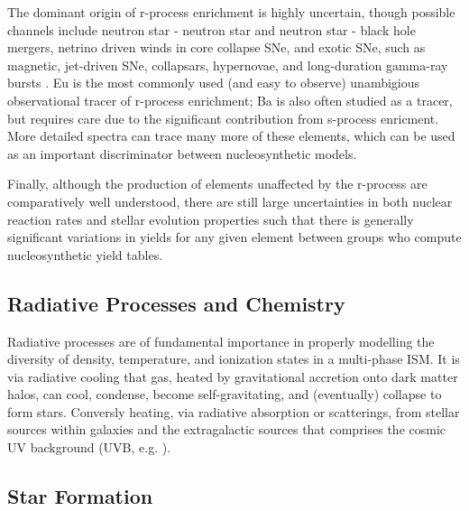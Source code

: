 The dominant origin of r-process enrichment is highly uncertain, though possible channels include neutron star - neutron star and neutron star - black hole mergers, netrino driven winds in core collapse SNe, and exotic SNe, such as magnetic, jet-driven SNe, collapsars, hypernovae, and long-duration gamma-ray bursts \citep[see ][ for recent reviews]{Frebel2018, Cowan2019}. Eu is the most commonly used (and easy to observe) unambigious observational tracer of r-process enrichment; Ba is also often studied as a tracer, but requires care due to the significant contribution from s-process enricment. More detailed spectra \citep[e.g.][]{Ji2018a} can trace many more of these elements, which can be used as an important discriminator between nucleosynthetic models.

Finally, although the production of elements unaffected by the r-process are comparatively well understood, there are still large uncertainties in both nuclear reaction rates and stellar evolution properties such that there is generally significant variations in yields for any given element between groups who compute nucleosynthetic yield tables.


\subsection{Radiative Processes and Chemistry}
\label{intro:sec:cooling}

Radiative processes are of fundamental importance in properly modelling the diversity of density, temperature, and ionization states in a multi-phase ISM. It is via radiative cooling that gas, heated by gravitational accretion onto dark matter halos, can cool, condense, become self-gravitating, and (eventually) collapse to form stars. Conversly heating, via radiative absorption or scatterings, from stellar sources within galaxies and the extragalactic sources that comprises the cosmic UV background (UVB, e.g. \cite{HM2001,HM2012,FG2011}).

\subsection{Star Formation} \label{intro:sec:sf}


